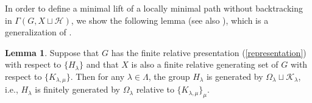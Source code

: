 \documentclass{amsart}
\theoremstyle{definition}
\newtheorem{Lem}[Thm]{Lemma}
\begin{document}
In order to define a minimal lift of a locally minimal path without backtracking in $\Gamma(G,X\sqcup{\mathcal H})$, we show the following lemma (see also \cite[Lemma 3.2]{Yan11}), which is a generalization of \cite[Proposition 2.9]{Osi06}. 

\begin{Lem}\label{2.27'}
Suppose that $G$ has the finite relative presentation (\ref{representation}) with respect to $\{H_\lambda\}$ and that $X$ is also a finite relative generating set of $G$ with respect to $\{K_{\lambda,\mu}\}$. 
Then for any $\lambda\in\Lambda$, the group $H_\lambda$ is generated by $\Omega_\lambda\sqcup {\mathcal K}_\lambda$, i.e., $H_\lambda$ is finitely generated by $\Omega_\lambda$ relative to $\{K_{\lambda,\mu}\}_\mu$. 
\end{Lem}
\end{document}
